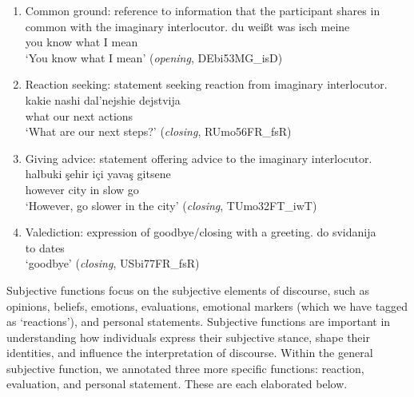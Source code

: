 \documentclass[output=paper,colorlinks,citecolor=brown]{langscibook}
\begin{document}
\begin{enumerate}[label=(\alph*)]
\item Common ground: reference to information that the participant shares in common with the imaginary interlocutor.   
\ea \label{katsikaetal:twelvecommon}
\gll du  weißt was  isch meine\\
     you know  what I    mean\\
\glt `You know what I mean' (\textit{opening}, DEbi53MG\_isD) 
\z

\item Reaction seeking: statement seeking reaction from imaginary interlocutor. 
\ea \label{katsikaetal:thirteenreactionseek}
\gll kakie nashi dal'nejshie dejstvija\\
     what our next actions\\
\glt `What are our next steps?' (\textit{closing}, RUmo56FR\_fsR) 
\z

\item Giving advice: statement offering advice to the imaginary interlocutor.
\ea \label{katsikaetal:fourteengadv}
\gll halbuki şehir içi    yavaş  gitsene\\
     however city  in     slow   go\\
\glt `However, go slower in the city' (\textit{closing}, TUmo32FT\_iwT) 
\z

\item Valediction: expression of goodbye\slash closing with a greeting.
\ea \label{katsikaetal:fifteenvalediction}
\gll do svidanija\\
     to dates\\
\glt `goodbye' (\textit{closing}, USbi77FR\_fsR) 
\z
\end{enumerate}

 Subjective functions focus on the subjective elements of discourse, such as opinions, beliefs, emotions, evaluations, emotional markers (which we have tagged as ‘reactions’), and personal statements. Subjective functions are important in understanding how individuals express their subjective stance, shape their identities, and influence the interpretation of discourse. Within the general subjective function, we annotated three more specific functions: reaction, evaluation, and personal statement. These are each elaborated below.
\end{document}
